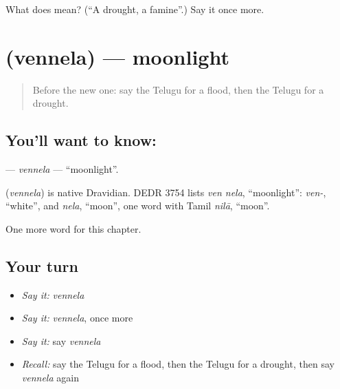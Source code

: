 \begin{tcolorbox}[breakable,colback=teal!4,colframe=teal!35!black,title={Before you move on}]
What does  mean? (\textquotedblleft{}A drought, a famine\textquotedblright{}.) Say it once more.
\end{tcolorbox}
\section[\texorpdfstring{\te{వెన్నెల} (vennela)}{వెన్నెల (vennela)}]{ (vennela) — moonlight}

\label{lesson:TE-C267-vennela}



\begin{quote}
Before the new one: say the Telugu for a flood, then the Telugu for a drought.
\end{quote}

\subsection*{You'll want to know: }
\textbf{} — \emph{vennela} — \textquotedblleft{}moonlight\textquotedblright{}.

\begin{cousinweb}
\textbf{} (\emph{vennela}) is native Dravidian. DEDR 3754 lists \emph{ven nela}, \textquotedblleft{}moonlight\textquotedblright{}: \emph{ven-}, \textquotedblleft{}white\textquotedblright{}, and \emph{nela}, \textquotedblleft{}moon\textquotedblright{}, one word with Tamil \emph{nilā}, \textquotedblleft{}moon\textquotedblright{}.
\end{cousinweb}

\begin{grammarlens}[title={What you've built}]
One more word for this chapter.
\end{grammarlens}

\subsection*{Your turn}
\begin{itemize}
\raggedright
  \item \emph{Say it:} \emph{vennela}
  \item \emph{Say it:} \emph{vennela}, once more
  \item \emph{Say it:} say \emph{vennela}
  \item \emph{Recall:} say the Telugu for a flood, then the Telugu for a drought, then say \emph{vennela} again
\end{itemize}

